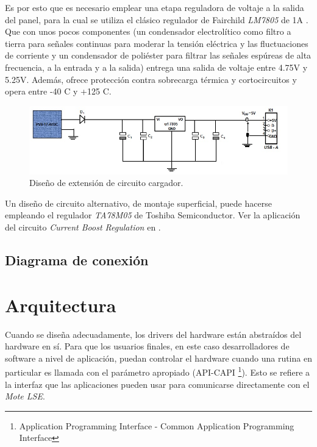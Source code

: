{Es por esto que es necesario emplear una etapa reguladora de voltaje a la salida del panel, para la cual se utiliza el clásico regulador de Fairchild \textit{LM7805} de 1A \citep{7805}. Que con unos pocos componentes (un condensador electrolítico como filtro a tierra para señales continuas para moderar la tensión eléctrica y las fluctuaciones de corriente y un condensador de poliéster para filtrar las señales espúreas de alta frecuencia, a la entrada y a la salida) entrega una salida de voltaje entre 4.75V y 5.25V. Además, ofrece protección contra sobrecarga térmica y cortocircuitos y opera entre -40 \grados C y +125 \grados C.

\begin{figure}[h!]
	\centering
    \includegraphics[width=1\textwidth]{./Figures/circuito.jpg}
    	\caption{Diseño de extensión de circuito cargador.}
	\label{fig:circuito}
\end{figure}

Un diseño de circuito alternativo, de montaje superficial, puede hacerse empleando el regulador \textit{TA78M05} de Toshiba Semiconductor. Ver la aplicación del circuito \textit{Current Boost Regulation} en \citep{78M05}.


\subsection{Diagrama de conexión}
\label{subsec:conexión}

\section{Arquitectura}
\label{sec:arq}
Cuando se diseña adecuadamente, los drivers del hardware están abstraídos del hardware en sí. Para que los usuarios finales, en este caso desarrolladores de software a nivel de aplicación, puedan controlar el hardware cuando una rutina en particular es llamada con el parámetro apropiado (API-CAPI \footnote{Application Programming Interface - Common Application Programming Interface}). Esto se refiere a la interfaz que las aplicaciones pueden usar para comunicarse directamente con el \textit{Mote LSE}.

}

